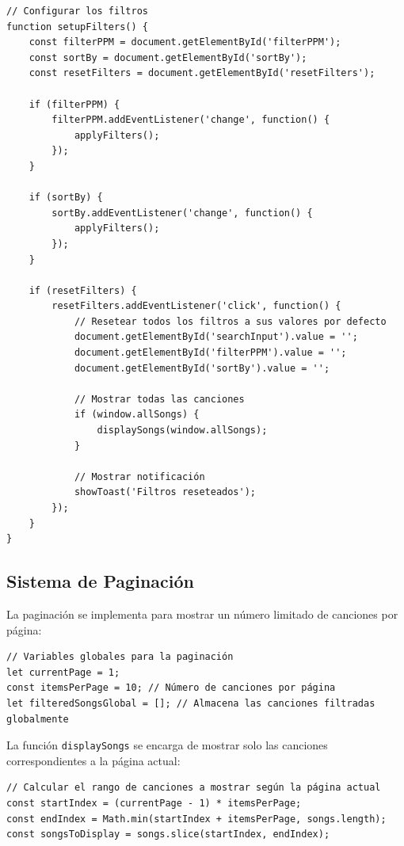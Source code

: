 \documentclass[a4paper,12pt]{article}
\begin{document}
\begin{verbatim}
// Configurar los filtros
function setupFilters() {
    const filterPPM = document.getElementById('filterPPM');
    const sortBy = document.getElementById('sortBy');
    const resetFilters = document.getElementById('resetFilters');
    
    if (filterPPM) {
        filterPPM.addEventListener('change', function() {
            applyFilters();
        });
    }
    
    if (sortBy) {
        sortBy.addEventListener('change', function() {
            applyFilters();
        });
    }
    
    if (resetFilters) {
        resetFilters.addEventListener('click', function() {
            // Resetear todos los filtros a sus valores por defecto
            document.getElementById('searchInput').value = '';
            document.getElementById('filterPPM').value = '';
            document.getElementById('sortBy').value = '';
            
            // Mostrar todas las canciones
            if (window.allSongs) {
                displaySongs(window.allSongs);
            }
            
            // Mostrar notificación
            showToast('Filtros reseteados');
        });
    }
}
\end{verbatim}

\subsection{Sistema de Paginación}
La paginación se implementa para mostrar un número limitado de canciones por página:

\begin{verbatim}
// Variables globales para la paginación
let currentPage = 1;
const itemsPerPage = 10; // Número de canciones por página
let filteredSongsGlobal = []; // Almacena las canciones filtradas globalmente
\end{verbatim}

La función \texttt{displaySongs} se encarga de mostrar solo las canciones correspondientes a la página actual:

\begin{verbatim}
// Calcular el rango de canciones a mostrar según la página actual
const startIndex = (currentPage - 1) * itemsPerPage;
const endIndex = Math.min(startIndex + itemsPerPage, songs.length);
const songsToDisplay = songs.slice(startIndex, endIndex);
\end{verbatim}
\end{document}
